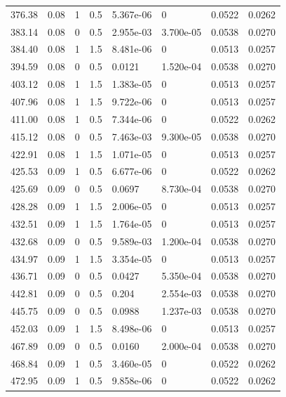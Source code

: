 \documentclass[preview]{standalone}
\begin{document}
{{{\begin{tabular}{L{1.2cm}C{1.2cm} C{0.3cm}C{0.5cm} C{1.4cm}C{1.4cm} C{1.4cm}C{1.4cm}}
  376.38  &  0.08  & 1     & 0.5 &  5.367e-06  & 0  & 0.0522 &  0.0262   \\ 
  383.14  &  0.08  & 0     & 0.5 &  2.955e-03  & 3.700e-05  & 0.0538 &  0.0270   \\ 
  384.40  &  0.08  & 1     & 1.5 &  8.481e-06  & 0  & 0.0513 &  0.0257   \\ 
  394.59  &  0.08  & 0     & 0.5 &  0.0121  & 1.520e-04  & 0.0538 &  0.0270   \\ 
  403.12  &  0.08  & 1     & 1.5 &  1.383e-05  & 0  & 0.0513 &  0.0257   \\ 
  407.96  &  0.08  & 1     & 1.5 &  9.722e-06  & 0  & 0.0513 &  0.0257   \\ 
  411.00  &  0.08  & 1     & 0.5 &  7.344e-06  & 0  & 0.0522 &  0.0262   \\ 
  415.12  &  0.08  & 0     & 0.5 &  7.463e-03  & 9.300e-05  & 0.0538 &  0.0270   \\ 
  422.91  &  0.08  & 1     & 1.5 &  1.071e-05  & 0  & 0.0513 &  0.0257   \\ 
  425.53  &  0.09  & 1     & 0.5 &  6.677e-06  & 0  & 0.0522 &  0.0262   \\ 
  425.69  &  0.09  & 0     & 0.5 &  0.0697  & 8.730e-04  & 0.0538 &  0.0270   \\ 
  428.28  &  0.09  & 1     & 1.5 &  2.006e-05  & 0  & 0.0513 &  0.0257   \\ 
  432.51  &  0.09  & 1     & 1.5 &  1.764e-05  & 0  & 0.0513 &  0.0257   \\ 
  432.68  &  0.09  & 0     & 0.5 &  9.589e-03  & 1.200e-04  & 0.0538 &  0.0270   \\ 
  434.97  &  0.09  & 1     & 1.5 &  3.354e-05  & 0  & 0.0513 &  0.0257   \\ 
  436.71  &  0.09  & 0     & 0.5 &  0.0427  & 5.350e-04  & 0.0538 &  0.0270   \\ 
  442.81  &  0.09  & 0     & 0.5 &  0.204  & 2.554e-03  & 0.0538 &  0.0270   \\ 
  445.75  &  0.09  & 0     & 0.5 &  0.0988  & 1.237e-03  & 0.0538 &  0.0270   \\ 
  452.03  &  0.09  & 1     & 1.5 &  8.498e-06  & 0  & 0.0513 &  0.0257   \\ 
  467.89  &  0.09  & 0     & 0.5 &  0.0160  & 2.000e-04  & 0.0538 &  0.0270   \\ 
  468.84  &  0.09  & 1     & 0.5 &  3.460e-05  & 0  & 0.0522 &  0.0262   \\ 
  472.95  &  0.09  & 1     & 0.5 &  9.858e-06  & 0  & 0.0522 &  0.0262   \\ 

\end{tabular}}}}
\end{document}
